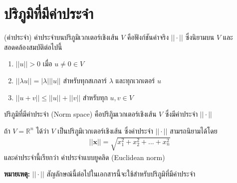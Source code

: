 \section{ปริภูมิที่มีค่าประจำ}

\begin{Definition}
    (ค่าประจำ)  ค่าประจำบนปริภูมิเวกเตอร์เชิงเส้น $V$ คือฟังก์ชันค่าจริง $ || \cdot ||$ ซึ่งนิยามบน $V$ และสอดคล้องสมบัติต่อไปนี้ 
    \begin{enumerate}
        \item $ ||u|| > 0 $ เมื่อ $ u \neq 0 \in V $
        \item $|| \lambda u || = | \lambda | || u || $ สำหรับทุกสเกลาร์ $\lambda$ และทุกเวกเตอร์ $u$
        \item $ ||u+v|| \leq ||u|| + ||v || $ สำหรับทุก $u,v \in V$
    \end{enumerate}
\end{Definition}

\begin{Definition} ปริภูมิที่มีค่าประจำ (Norm space) คือปริภูิมเวกเตอร์เชิงเส้น $V$ ซึ่งมีค่าประจำ $ || \cdot ||$
\end{Definition}

\begin{Example}
    ถ้า $V = \mathbb{R}^{n}$ ได้ว่า $V$ เป็นปริภูมิเวกเตอร์เชิงเส้น ซึ่งค่าประจำ $ || \cdot ||$ สามรถนิยามได้โดย
    \begin{align}
        || \boldsymbol{x} || = \sqrt{x_1^2 + x_2^2 + ... + x_n^2 } 
    \end{align}
    และค่าประจำนี้เรียกว่า ค่าประจำแบบยูคลิด (Euclidean norm) 
\end{Example}

\textbf{หมายเหตุ:} $ || \cdot ||$ สัญลักษณ์นี้ต่อไปในเอกสารนี้จะใช้สำหรับปริภูมิที่มีค่าประจำ